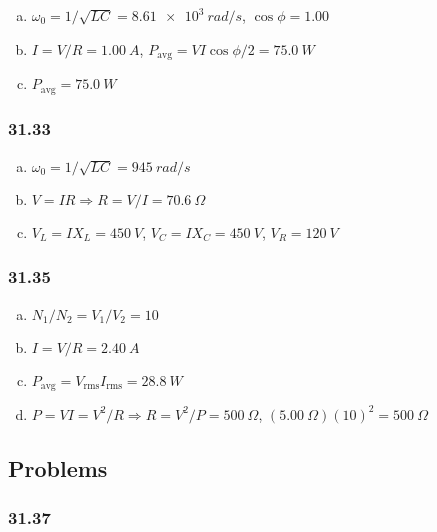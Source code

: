 \documentclass{article}
\begin{document}
\begin{enumerate}[(a)]
  \item $\omega_0 = 1 / \sqrt{L C} = \qty{8.61e3}{rad/s}$, $\cos \phi = 1.00$

  \item $I = V / R = \qty{1.00}{A}$, $P_\text{avg} = V I \cos \phi / 2 = \qty{75.0}{W}$

  \item $P_\text{avg} = \qty{75.0}{W}$
\end{enumerate}

\subsubsection{31.33}

\begin{enumerate}[(a)]
  \item $\omega_0 = 1 / \sqrt{L C} = \qty{945}{rad/s}$

  \item $V = I R \Rightarrow R = V / I = \qty{70.6}{\Omega}$

  \item $V_L = I X_L = \qty{450}{V}$, $V_C = I X_C = \qty{450}{V}$, $V_R = \qty{120}{V}$
\end{enumerate}

\subsubsection{31.35}

\begin{enumerate}[(a)]
  \item $N_1 / N_2 = V_1 / V_2 = 10$

  \item $I = V / R = \qty{2.40}{A}$

  \item $P_\text{avg} = V_\text{rms} I_\text{rms} = \qty{28.8}{W}$

  \item $P = V I = V^2 / R \Rightarrow R = V^2 / P = \qty{500}{\Omega}$, $(\qty{5.00}{\Omega}) (10)^2 = \qty{500}{\Omega}$
\end{enumerate}

\subsection{Problems}

\subsubsection{31.37}
\end{document}
